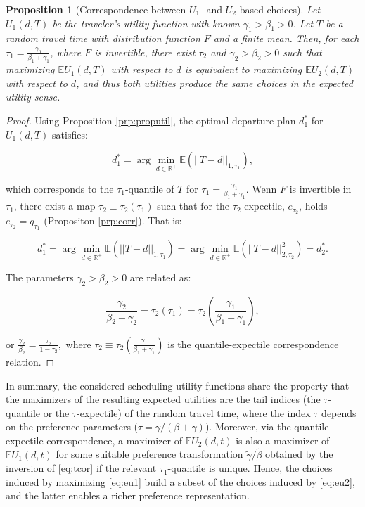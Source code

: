 \documentclass[preprint, 3p, authoryear]{elsarticle} %
\newtheorem{proposition}{Proposition}[section]
\theoremstyle{definition}
\theoremstyle{definition}
\theoremstyle{definition}
\theoremstyle{definition}
\theoremstyle{remark}
\begin{document}
\begin{proposition}[Correspondence between $U_1$- and $U_2$-based choices]
\protect\hypertarget{prp:proputil2}{}\label{prp:proputil2}Let \(U_1(d,T)\) be the traveler's utility function with known \(\gamma_1>\beta_1>0\). Let \(T\) be a random travel time with distribution function \(F\) and a finite mean. Then, for each \(\tau_1 = \frac{\gamma_1}{\beta_1+\gamma_1}\), where \(F\) is invertible, there exist \(\tau_2\) and \(\gamma_2>\beta_2>0\) such that maximizing \(\mathbb E U_1(d,T)\) with respect to \(d\) is equivalent to maximizing \(\mathbb E U_2(d,T)\) with respect to \(d\), and thus both utilities produce the same choices in the expected utility sense.

\end{proposition}

\begin{proof}
Using Proposition \ref{prp:proputil}, the optimal departure plan \(d_1^*\) for \(U_1(d,T)\) satisfies:

\[d_1^* = \arg\min_{d\in \mathbb R^+}\mathbb E\left(||T-d||_{1,\tau_1}\right),\]

which corresponds to the \(\tau_1\)-quantile of \(T\) for \(\tau_1=\frac{\gamma_1}{\beta_1+\gamma_1}\). Wenn \(F\) is invertible in \(\tau_1\), there exist a map \(\tau_2\equiv\tau_2(\tau_1)\) such that for the \(\tau_2\)-expectile, \(e_{\tau_2}\), holds \(e_{\tau_2} = q_{\tau_1}\) (Propositon \ref{prp:corr}). That is:

\[d_1^* = \arg\min_{d\in \mathbb R^+}\mathbb E\left(||T-d||_{1,\tau_1}\right) = \arg\min_{d\in \mathbb R^+}\mathbb E\left(||T-d||_{2,\tau_2}^2\right) = d_2^*.\]

The parameters \(\gamma_2>\beta_2>0\) are related as:

\begin{equation}\frac{\gamma_2}{\beta_2+\gamma_2} = \tau_2(\tau_1) = \tau_2\left(\frac{\gamma_1}{\beta_1+\gamma_1}\right), \label{eq:tcor}
\end{equation}

or \(\frac{\gamma_2}{\beta_2} = \frac{\tau_2}{1-\tau_2},\) where \(\tau_2\equiv \tau_2\left(\frac{\gamma_1}{\beta_1+\gamma_1}\right)\) is the quantile-expectile correspondence relation.
\end{proof}

In summary, the considered scheduling utility functions share the property that the maximizers of the resulting expected utilities are the tail indices (the \(\tau\)-quantile or the \(\tau\)-expectile) of the random travel time, where the index \(\tau\) depends on the preference parameters (\(\tau=\gamma/(\beta+\gamma)\)). Moreover, via the quantile-expectile correspondence, a maximizer of \(\mathbb EU_2(d,t)\) is also a maximizer of \(\mathbb EU_1(d,t)\) for some suitable preference transformation \(\tilde\gamma/\tilde \beta\) obtained by the inversion of \eqref{eq:tcor} if the relevant \(\tau_1\)-quantile is unique. Hence, the choices induced by maximizing \eqref{eq:eu1} build a subset of the choices induced by \eqref{eq:eu2}, and the latter enables a richer preference representation.
\end{document}
